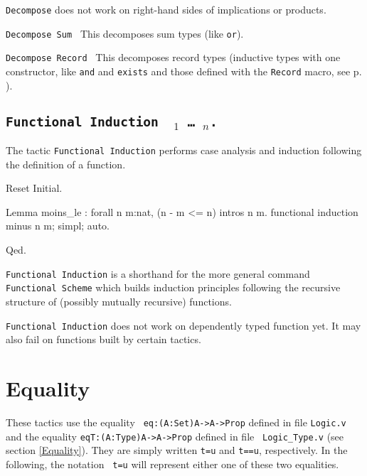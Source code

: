 {\tt Decompose} does not work on right-hand sides of implications or products.

\begin{Variants}
  
\item {\tt Decompose Sum \term}
  This decomposes sum types (like \texttt{or}).
\item {\tt Decompose Record \term}
  This decomposes record types (inductive types with one constructor,
  like \texttt{and} and \texttt{exists} and those defined with the
  \texttt{Record} macro, see p. \pageref{Record}).
\end{Variants}


\subsection{\tt Functional Induction \ident\ \term$_1$ \dots\ \term$_n$.}
\label{FunInduction}

The tactic \texttt{Functional Induction} performs case analysis
and induction following the definition of a function.

\begin{coq_eval}
Reset Initial.
\end{coq_eval}
\begin{coq_example}
Lemma moins_le : forall n m:nat, (n - m <= n)%
intros n m.
functional induction minus n m; simpl; auto.
\end{coq_example}
\begin{coq_example*}
Qed.
\end{coq_example*}

\texttt{Functional Induction} is a shorthand for the more general
command \texttt{Functional Scheme} which builds induction
principles following the recursive structure of (possibly
mutually recursive) functions.

\texttt{Functional Induction} does not work on dependently typed
function yet. It may also fail on functions built by certain
tactics.

\SeeAlso{\ref{FunScheme},\ref{FunScheme-examples}}

\section{Equality}
These tactics use the equality {\tt
eq:(A:Set)A->A->Prop} defined in file {\tt Logic.v} and the equality
{\tt eqT:(A:Type)A->A->Prop} defined in file {\tt
Logic\_Type.v} (see section \ref{Equality}). They
are simply written {\tt t=u} and {\tt t==u},
respectively.  In the following, the notation {\tt
t=u} will represent either one of these two
equalities.

